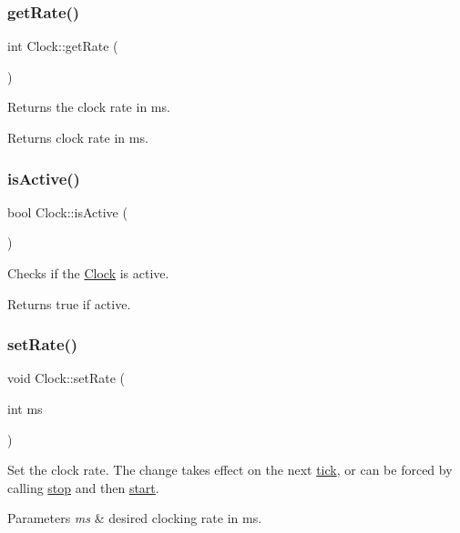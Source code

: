 \subsubsection{\texorpdfstring{get\+Rate()}{getRate()}}
{\footnotesize\ttfamily int Clock\+::get\+Rate (\begin{DoxyParamCaption}{ }\end{DoxyParamCaption})}

Returns the clock rate in ms. \begin{DoxyReturn}{Returns}
clock rate in ms. 
\end{DoxyReturn}
\mbox{\label{classdrumpi_1_1clock_1_1Clock_a7ea74e7a255c6b426b238982a9e0f349}} 
\subsubsection{\texorpdfstring{is\+Active()}{isActive()}}
{\footnotesize\ttfamily bool Clock\+::is\+Active (\begin{DoxyParamCaption}{ }\end{DoxyParamCaption})}

Checks if the \hyperlink{classdrumpi_1_1clock_1_1Clock}{Clock} is active. \begin{DoxyReturn}{Returns}
{\ttfamily true} if active. 
\end{DoxyReturn}
\mbox{\label{classdrumpi_1_1clock_1_1Clock_aa9727786f11c753730901fee28cde1ea}} 
\subsubsection{\texorpdfstring{set\+Rate()}{setRate()}}
{\footnotesize\ttfamily void Clock\+::set\+Rate (\begin{DoxyParamCaption}\item[{int}]{ms }\end{DoxyParamCaption})}

Set the clock rate. The change takes effect on the next \hyperlink{classdrumpi_1_1clock_1_1Clock_ade9259c06e6b90bbd92e155a2506d3a1}{tick}, or can be forced by calling \hyperlink{classdrumpi_1_1clock_1_1Clock_a0b77c3e7f33eb7ae0f018e469d96a250}{stop} and then \hyperlink{classdrumpi_1_1clock_1_1Clock_a8a050959dcff11c85d695989e9099a8c}{start}. 
\begin{DoxyParams}{Parameters}
{\em ms} & desired clocking rate in ms. \\
\hline
\end{DoxyParams}
\mbox{\label{classdrumpi_1_1clock_1_1Clock_a8a050959dcff11c85d695989e9099a8c}} 
